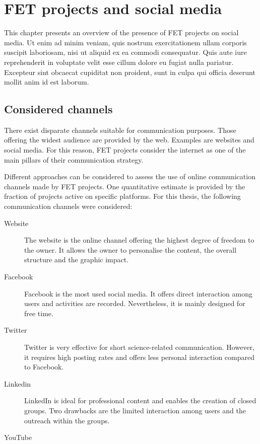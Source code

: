 \chapter{FET projects and social media}
This chapter presents an overview of the presence of FET projects on social media. Ut enim ad minim veniam, quis nostrum exercitationem ullam corporis suscipit laboriosam, nisi ut aliquid ex ea commodi consequatur. Quis aute iure reprehenderit in voluptate velit esse cillum dolore eu fugiat nulla pariatur. Excepteur sint obcaecat cupiditat non proident, sunt in culpa qui officia deserunt mollit anim id est laborum.

\section{Considered channels} 
There exist disparate channels suitable for communication purposes. Those offering the widest audience are provided by the web. Examples are websites and social media. For this reason, FET projects consider the internet as one of the main pillars of their communication strategy.

Different approaches can be considered to assess the use of online communication channels made by FET projects. One quantitative estimate is provided by the fraction of projects active on specific platforms. For this thesis, the following communication channels were considered:   

\begin{description}
 \item [Website] The website is the online channel offering the highest degree of freedom to the owner. It allows the owner to personalise the content, the overall structure and the graphic impact.
 \item [Facebook] Facebook is the most used social media. It offers direct interaction among users and activities are recorded. Nevertheless, it is mainly designed for free time.  
 \item [Twitter] Twitter is very effective for short science-related communication. However, it requires high posting rates and offers less personal interaction compared to Facebook.
 \item [Linkedin] LinkedIn is ideal for professional content and enables the creation of closed groups. Two drawbacks are the limited interaction among users and the outreach within the groups.
 \item [YouTube] 
\end{description}

